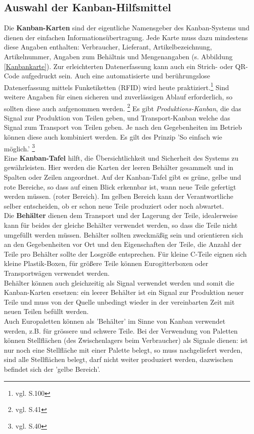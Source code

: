 \subsection{Auswahl der Kanban-Hilfsmittel}
Die \textbf{Kanban-Karten} sind der eigentliche Namensgeber des Kanban-Systems und dienen der einfachen Informationsübertragung.
Jede Karte muss dazu mindestens diese Angaben enthalten: Verbraucher, Lieferant, Artikelbezeichnung, Artikelnummer, 
Angaben zum Behältnis und Mengenangaben (s. Abbildung \ref{Kanbankarte}). 
Zur erleichterten Datenerfassung kann auch ein Strich- oder QR-Code aufgedruckt sein.
Auch eine automatisierte und berührungslose Datenerfassung mittels Funketiketten (RFID) wird heute praktiziert.\footnote{vgl. \cite{Weber2014KE} S.100}
Sind weitere Angaben für einen sicheren und zuverlässigen Ablauf erforderlich, so sollten diese auch aufgenommen werden.
\footnote{vgl. \cite{Geiger2011Kanban} S.41}
Es gibt \textit{Produktions-Kanban}, die das Signal zur Produktion von Teilen geben, 
und Transport-Kanban welche das Signal zum Transport von Teilen geben.
Je nach den Gegebenheiten im Betrieb können diese auch kombiniert werden. Es gilt des Prinzip 'So einfach wie möglich.'
\footnote{vgl. \cite{Geiger2011Kanban} S.40}\\

Eine \textbf{Kanban-Tafel} hilft, die Übersichtlichkeit und Sicherheit des Systems zu gewährleisten. 
Hier werden die Karten der leeren Behälter gesammelt und in Spalten oder Zeilen angeordnet.  
Auf der Kanban-Tafel gibt es grüne, gelbe und rote Bereiche, so dass auf einen Blick erkennbar ist, wann neue Teile gefertigt werden müssen. (roter Bereich).
Im gelben Bereich kann der Verantwortliche selber entscheiden, ob er schon neue Teile produziert oder noch abwartet.\\

Die \textbf{Behälter} dienen dem Transport und der Lagerung der Teile, idealerweise kann für beides der gleiche 
Behälter verwendet werden, so dass die Teile nicht umgefüllt werden müssen. Behälter sollten 
zweckmäßig sein und orientieren sich an den Gegebenheiten vor Ort und den Eigenschaften der Teile, 
die Anzahl der Teile pro Behälter sollte der Losgröße entsprechen.
Für kleine C-Teile eignen sich kleine Plastik-Boxen, für größere Teile können Eurogitterboxen 
oder Transportwägen verwendet werden.\\
Behälter können auch gleichzeitig als Signal verwendet werden und somit die Kanban-Karten ersetzen: ein leerer 
Behälter ist ein Signal zur Produktion neuer Teile und muss von der Quelle unbedingt 
wieder in der vereinbarten Zeit mit neuen Teilen befüllt werden.\\
Auch Europaletten können als 'Behälter' im Sinne von Kanban verwendet werden, z.B. für grössere und schwere Teile.
Bei der Verwendung von Paletten können Stellflächen (des Zwischenlagers beim Verbraucher) als Signale dienen: 
ist nur noch eine Stellfläche mit einer Palette belegt, so muss nachgeliefert werden, sind alle Stellflächen belegt, 
darf nicht weiter produziert werden, dazwischen befindet sich der 'gelbe Bereich'.

